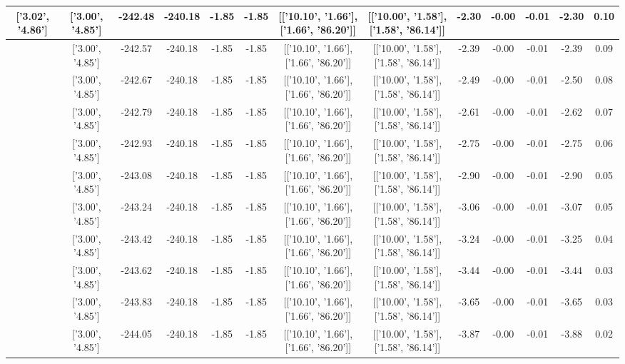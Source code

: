 \begin{table}[htbp]
\begin{adjustbox}{angle=90}
\begin{tabular}{|c|c|c|c|c|c|c|c|c|c|c|c|c|}
 ['3.02', '4.86'] & ['3.00', '4.85'] & -242.48 & -240.18 & -1.85 & -1.85 & [['10.10', '1.66'], ['1.66', '86.20']] & [['10.00', '1.58'], ['1.58', '86.14']] & -2.30 & -0.00 & -0.01 & -2.30 & 0.10\\ \hline
 ['3.02', '4.86'] & ['3.00', '4.85'] & -242.57 & -240.18 & -1.85 & -1.85 & [['10.10', '1.66'], ['1.66', '86.20']] & [['10.00', '1.58'], ['1.58', '86.14']] & -2.39 & -0.00 & -0.01 & -2.39 & 0.09\\ \hline
 ['3.03', '4.86'] & ['3.00', '4.85'] & -242.67 & -240.18 & -1.85 & -1.85 & [['10.10', '1.66'], ['1.66', '86.20']] & [['10.00', '1.58'], ['1.58', '86.14']] & -2.49 & -0.00 & -0.01 & -2.50 & 0.08\\ \hline
 ['3.03', '4.86'] & ['3.00', '4.85'] & -242.79 & -240.18 & -1.85 & -1.85 & [['10.10', '1.66'], ['1.66', '86.20']] & [['10.00', '1.58'], ['1.58', '86.14']] & -2.61 & -0.00 & -0.01 & -2.62 & 0.07\\ \hline
 ['3.04', '4.86'] & ['3.00', '4.85'] & -242.93 & -240.18 & -1.85 & -1.85 & [['10.10', '1.66'], ['1.66', '86.20']] & [['10.00', '1.58'], ['1.58', '86.14']] & -2.75 & -0.00 & -0.01 & -2.75 & 0.06\\ \hline
 ['3.04', '4.86'] & ['3.00', '4.85'] & -243.08 & -240.18 & -1.85 & -1.85 & [['10.10', '1.66'], ['1.66', '86.20']] & [['10.00', '1.58'], ['1.58', '86.14']] & -2.90 & -0.00 & -0.01 & -2.90 & 0.05\\ \hline
 ['3.04', '4.86'] & ['3.00', '4.85'] & -243.24 & -240.18 & -1.85 & -1.85 & [['10.10', '1.66'], ['1.66', '86.20']] & [['10.00', '1.58'], ['1.58', '86.14']] & -3.06 & -0.00 & -0.01 & -3.07 & 0.05\\ \hline
 ['3.05', '4.86'] & ['3.00', '4.85'] & -243.42 & -240.18 & -1.85 & -1.85 & [['10.10', '1.66'], ['1.66', '86.20']] & [['10.00', '1.58'], ['1.58', '86.14']] & -3.24 & -0.00 & -0.01 & -3.25 & 0.04\\ \hline
 ['3.05', '4.86'] & ['3.00', '4.85'] & -243.62 & -240.18 & -1.85 & -1.85 & [['10.10', '1.66'], ['1.66', '86.20']] & [['10.00', '1.58'], ['1.58', '86.14']] & -3.44 & -0.00 & -0.01 & -3.44 & 0.03\\ \hline
 ['3.05', '4.86'] & ['3.00', '4.85'] & -243.83 & -240.18 & -1.85 & -1.85 & [['10.10', '1.66'], ['1.66', '86.20']] & [['10.00', '1.58'], ['1.58', '86.14']] & -3.65 & -0.00 & -0.01 & -3.65 & 0.03\\ \hline
 ['3.06', '4.86'] & ['3.00', '4.85'] & -244.05 & -240.18 & -1.85 & -1.85 & [['10.10', '1.66'], ['1.66', '86.20']] & [['10.00', '1.58'], ['1.58', '86.14']] & -3.87 & -0.00 & -0.01 & -3.88 & 0.02\\ \hline

\end{tabular}
\end{adjustbox}
\end{table}
